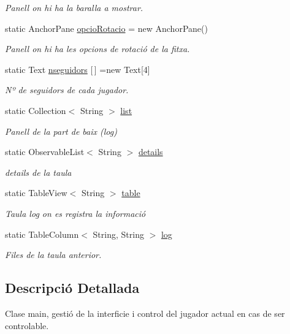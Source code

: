 \begin{DoxyCompactItemize}
\begin{DoxyCompactList}\small\item\em Panell on hi ha la baralla a mostrar. \end{DoxyCompactList}\item 
static Anchor\+Pane \mbox{\hyperlink{class_gui_a3db6ceba3ef9bd93f4133cfe53780a6e}{opcio\+Rotacio}} = new Anchor\+Pane()
\begin{DoxyCompactList}\small\item\em Panell on hi ha les opcions de rotació de la fitxa. \end{DoxyCompactList}\item 
static Text \mbox{\hyperlink{class_gui_a2ada5459adcc1ecae5c95fbebaebba23}{nseguidors}} \mbox{[}$\,$\mbox{]} =new Text\mbox{[}4\mbox{]}
\begin{DoxyCompactList}\small\item\em Nº de seguidors de cada jugador. \end{DoxyCompactList}\item 
static Collection$<$ String $>$ \mbox{\hyperlink{class_gui_a96cd26aa3620f84f675a677f50ab41ac}{list}}
\begin{DoxyCompactList}\small\item\em Panell de la part de baix (log) \end{DoxyCompactList}\item 
static Observable\+List$<$ String $>$ \mbox{\hyperlink{class_gui_a76ab837fe79bf857f48dfe94448b67e5}{details}}
\begin{DoxyCompactList}\small\item\em details de la taula \end{DoxyCompactList}\item 
static Table\+View$<$ String $>$ \mbox{\hyperlink{class_gui_a7c14044a11ed6ac6b484cdc0d1a090ee}{table}}
\begin{DoxyCompactList}\small\item\em Taula log on es registra la informació \end{DoxyCompactList}\item 
static Table\+Column$<$ String, String $>$ \mbox{\hyperlink{class_gui_aa2adf41c77e0946975bc9107dd5712f6}{log}}
\begin{DoxyCompactList}\small\item\em Files de la taula anterior. \end{DoxyCompactList}\end{DoxyCompactItemize}


\subsection{Descripció Detallada}
Clase main, gestió de la interficie i control del jugador actual en cas de ser controlable. 

